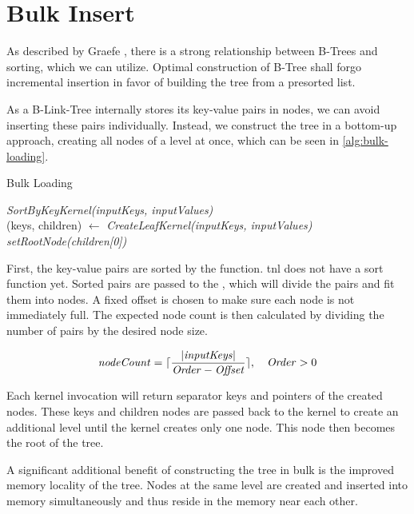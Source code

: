 \section{Bulk Insert}

As described by Graefe \cite{goetz-tech}, there is a strong relationship between B-Trees and sorting, which we can utilize. Optimal construction of B-Tree shall forgo incremental insertion in favor of building the tree from a presorted list.

As a B-Link-Tree internally stores its key-value pairs in nodes, we can avoid inserting these pairs individually. Instead, we construct the tree in a bottom-up approach, creating all nodes of a level at once, which can be seen in \cref{alg:bulk-loading}.

\begin{algorithm}[H]
  \caption{Bulk Loading}\label{alg:bulk-loading}

  \textit{SortByKeyKernel(inputKeys, inputValues)}\\

  (keys, children) $\gets$ \textit{CreateLeafKernel(inputKeys, inputValues)}\\
  \textit{setRootNode(children[0])}
\end{algorithm}

First, the key-value pairs are sorted by the  function. \acrshort{tnl} does not have a sort function yet. Sorted pairs are passed to the , which will divide the pairs and fit them into nodes. A fixed offset is chosen to make sure each node is not immediately full. 
The expected node count is then calculated by dividing the number of pairs by the desired node size.  

$$\mathit{nodeCount} = \lceil\frac{|\mathit{inputKeys}|}{\mathit{Order} - \mathit{Offset}}\rceil,\quad \begin{aligned} \mathit{Order} > 0\end{aligned}$$

Each kernel invocation will return separator keys and pointers of the created nodes. These keys and children nodes are passed back to the kernel to create an additional level until the kernel creates only one node. This node then becomes the root of the tree.

A significant additional benefit of constructing the tree in bulk is the improved memory locality of the tree. Nodes at the same level are created and inserted into memory simultaneously and thus reside in the memory near each other.


